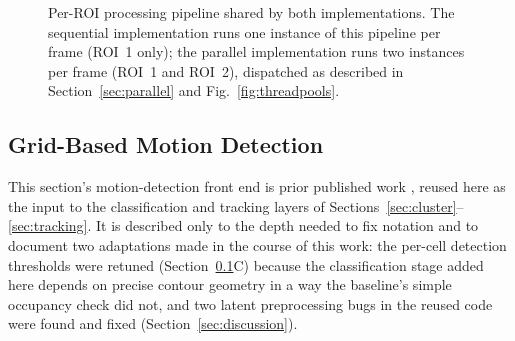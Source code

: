 \documentclass[conference]{IEEEtran}
\begin{document}
\begin{figure}[t]
\centering
{}
\caption{Per-ROI processing pipeline shared by both implementations.
The sequential implementation runs one instance of this pipeline per
frame (ROI~1 only); the parallel implementation runs two instances per
frame (ROI~1 and ROI~2), dispatched as described in
Section~\ref{sec:parallel} and Fig.~\ref{fig:threadpools}.}
\label{fig:pipeline}
\end{figure}

\subsection{Grid-Based Motion Detection}
\label{sec:motion}

This section's motion-detection front end is prior published work
\cite{baseline}, reused here as the input to the classification and
tracking layers of Sections~\ref{sec:cluster}--\ref{sec:tracking}. It is
described only to the depth needed to fix notation and to document two
adaptations made in the course of this work: the per-cell detection
thresholds were retuned (Section~\ref{sec:motion}C) because the
classification stage added here depends on precise contour geometry in
a way the baseline's simple occupancy check did not, and two latent
preprocessing bugs in the reused code were found and fixed
(Section~\ref{sec:discussion}).
\end{document}
